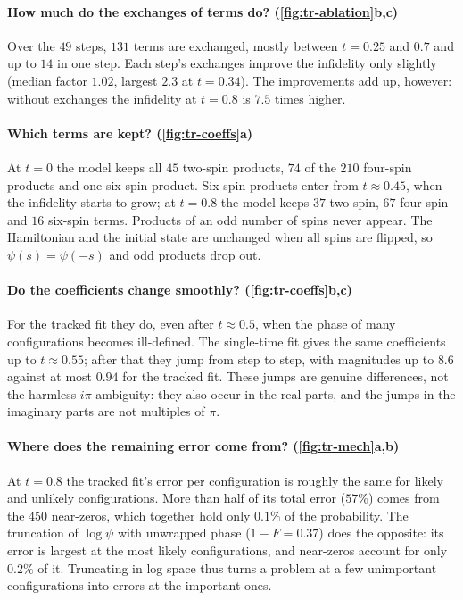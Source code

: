 \documentclass[11pt,a4paper]{article}
\begin{document}
\paragraph{How much do the exchanges of terms do? (\cref{fig:tr-ablation}b,c)} Over the $49$ steps, $131$ terms are exchanged, mostly between $t=0.25$ and $0.7$ and up to $14$ in one step. Each step's exchanges improve the infidelity only slightly (median factor $1.02$, largest $2.3$ at $t=0.34$). The improvements add up, however: without exchanges the infidelity at $t=0.8$ is $7.5$ times higher.

\paragraph{Which terms are kept? (\cref{fig:tr-coeffs}a)} At $t=0$ the model keeps all $45$ two-spin products, $74$ of the $210$ four-spin products and one six-spin product. Six-spin products enter from $t\approx0.45$, when the infidelity starts to grow; at $t=0.8$ the model keeps $37$ two-spin, $67$ four-spin and $16$ six-spin terms. Products of an odd number of spins never appear. The Hamiltonian and the initial state are unchanged when all spins are flipped, so $\psi(s)=\psi(-s)$ and odd products drop out.

\paragraph{Do the coefficients change smoothly? (\cref{fig:tr-coeffs}b,c)} For the tracked fit they do, even after $t\approx0.5$, when the phase of many configurations becomes ill-defined. The single-time fit gives the same coefficients up to $t\approx0.55$; after that they jump from step to step, with magnitudes up to $8.6$ against at most $0.94$ for the tracked fit. These jumps are genuine differences, not the harmless $i\pi$ ambiguity: they also occur in the real parts, and the jumps in the imaginary parts are not multiples of $\pi$.

\paragraph{Where does the remaining error come from? (\cref{fig:tr-mech}a,b)} At $t=0.8$ the tracked fit's error per configuration is roughly the same for likely and unlikely configurations. More than half of its total error ($57\%$) comes from the $450$ near-zeros, which together hold only $0.1\%$ of the probability. The truncation of $\log\psi$ with unwrapped phase ($1-F=0.37$) does the opposite: its error is largest at the most likely configurations, and near-zeros account for only $0.2\%$ of it. Truncating in log space thus turns a problem at a few unimportant configurations into errors at the important ones.
\end{document}

